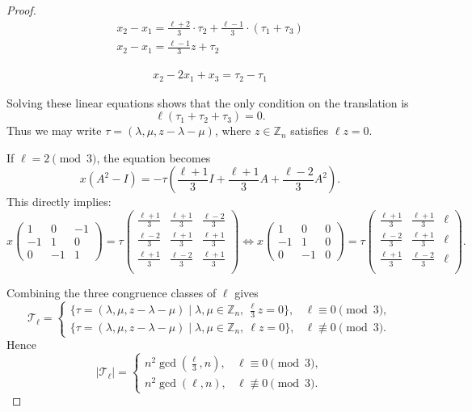 \documentclass[12pt]{article}
\theoremstyle{definition}
\theoremstyle{remark}
\begin{document}
\begin{proof}
{\begin{align*}
   x_2-x_1=\frac{\ell+2}{3}\cdot\tau_2+\frac{\ell-1}{3}\cdot(\tau_1+\tau_3)\\
   x_2-x_1=\frac{\ell-1}{3}z+\tau_2
\end{align*}

\begin{align*}
   x_2-2x_1+x_3=\tau_2-\tau_1
\end{align*}
}
{\color{blue}Solving these linear equations shows that the only condition on the translation is
\[
\ell(\tau_1+\tau_2+\tau_3)=0.
\]
Thus we may write $\tau=(\lambda,\mu,z-\lambda-\mu)$, where $z\in\mathbb Z_n$ satisfies $\ell z=0$.}



If $\ell = 2 \pmod 3$, the equation becomes
\[
x\left( A^2- I\right) = -\tau \left(\frac{\ell+1}{3} I+ \frac{\ell +1}{3} A+ \frac{\ell -2}{3} A^2\right).
\]
This directly implies:
\[
x\begin{pmatrix} 1 & 0 & -1 \\
-1 & 1 & 0 \\
0 & -1 & 1
\end{pmatrix}=\tau \begin{pmatrix}
    \frac{\ell+1}{3} & \frac{\ell+1}{3} & \frac{\ell -2}{3}\\
    \frac{\ell -2}{3} & \frac{\ell+1}{3} & \frac{\ell+1}{3}\\
    \frac{\ell+1}{3} & \frac{\ell -2}{3} &  \frac{\ell+1}{3}
    \\
\end{pmatrix}
\Leftrightarrow
x\begin{pmatrix} 1 & 0 & 0 \\
 -1& 1 & 0 \\
0 & -1 & 0
\end{pmatrix}=\tau \begin{pmatrix}
    \frac{\ell+1}{3} & \frac{\ell+1}{3} & \ell\\
    \frac{\ell -2}{3} & \frac{\ell+1}{3} & \ell\\
    \frac{\ell+1}{3} & \frac{\ell -2}{3} &\ell
    \\
\end{pmatrix}.
\]

Combining the three congruence classes of $\ell$ gives
\[
\mathcal{T}_\ell =
\begin{cases}
\{\tau=(\lambda,\mu,z-\lambda-\mu)\mid \lambda,\mu\in\mathbb Z_n,\ \frac{\ell}{3}z=0\}, & \ell\equiv0\pmod 3,\\[4pt]
\{\tau=(\lambda,\mu,z-\lambda-\mu)\mid \lambda,\mu\in\mathbb Z_n,\ \ell z=0\}, & \ell\not\equiv0\pmod 3.
\end{cases}
\]
Hence
\[
|\mathcal T_\ell|=
\begin{cases}
n^2\gcd(\frac{\ell}{3},n), & \ell\equiv0\pmod 3,\\
n^2\gcd(\ell,n), & \ell\not\equiv0\pmod 3.
\end{cases}
\]




\end{proof}
\end{document}
